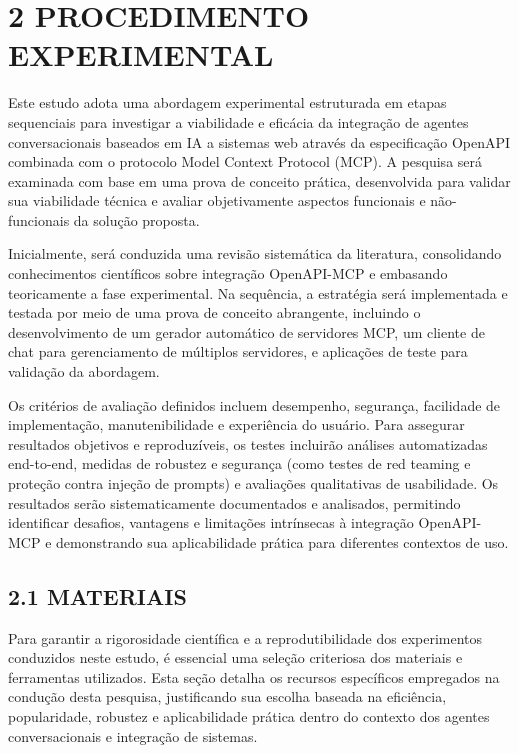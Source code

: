 \documentclass[
]{article}
\begin{document}
\section{2 PROCEDIMENTO EXPERIMENTAL}\label{procedimento-experimental}

Este estudo adota uma abordagem experimental estruturada em etapas
sequenciais para investigar a viabilidade e eficácia da integração de
agentes conversacionais baseados em IA a sistemas web através da
especificação OpenAPI combinada com o protocolo Model Context Protocol
(MCP). A pesquisa será examinada com base em uma prova de conceito
prática, desenvolvida para validar sua viabilidade técnica e avaliar
objetivamente aspectos funcionais e não-funcionais da solução proposta.

Inicialmente, será conduzida uma revisão sistemática da literatura,
consolidando conhecimentos científicos sobre integração OpenAPI-MCP e
embasando teoricamente a fase experimental. Na sequência, a estratégia
será implementada e testada por meio de uma prova de conceito
abrangente, incluindo o desenvolvimento de um gerador automático de
servidores MCP, um cliente de chat para gerenciamento de múltiplos
servidores, e aplicações de teste para validação da abordagem.

Os critérios de avaliação definidos incluem desempenho, segurança,
facilidade de implementação, manutenibilidade e experiência do usuário.
Para assegurar resultados objetivos e reproduzíveis, os testes incluirão
análises automatizadas end-to-end, medidas de robustez e segurança (como
testes de red teaming e proteção contra injeção de prompts) e avaliações
qualitativas de usabilidade. Os resultados serão sistematicamente
documentados e analisados, permitindo identificar desafios, vantagens e
limitações intrínsecas à integração OpenAPI-MCP e demonstrando sua
aplicabilidade prática para diferentes contextos de uso.

\subsection{2.1 MATERIAIS}\label{materiais}

Para garantir a rigorosidade científica e a reprodutibilidade dos
experimentos conduzidos neste estudo, é essencial uma seleção criteriosa
dos materiais e ferramentas utilizados. Esta seção detalha os recursos
específicos empregados na condução desta pesquisa, justificando sua
escolha baseada na eficiência, popularidade, robustez e aplicabilidade
prática dentro do contexto dos agentes conversacionais e integração de
sistemas.
\end{document}
